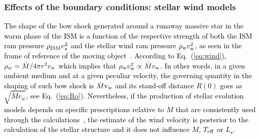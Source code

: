 \documentclass[useAMS,usenatbib]{mn2e}
\begin{document}


\subsubsection{Effects of the boundary conditions: stellar wind models}
\label{sect:physics33}


\textcolor{black}{
The shape of the bow shock generated around a runaway massive star in the warm 
phase of the ISM is a function of the respective strength of both the ISM ram 
pressure $\rho_{\rm ISM}v_{\star}^{2}$ and the stellar wind ram pressure 
$\rho_{\rm w}v_{\rm w}^{2}$, as seen in the frame of reference of the moving 
object~\citep[see explanations in][]{mohamed_aa_541_2012}. According to 
Eq.~(\ref{eq:wind}), $\rho_{w}=\dot{M} / 4\pi r^{2} v_{\rm w}$ which implies 
that $\rho_{\rm w}v_{\rm w}^{2} \propto \dot{M} v_{\rm w}$. In other words, in a 
given ambient medium and at a given peculiar velocity, the governing quantity 
in the shaping of such bow shock is $\dot{M}\rm v_{w}$ and its stand-off 
distance $R(0)$ goes as $\sqrt{ \dot{M} v_{w} }$, see Eq.~(\ref{eq:Ro}). 
Nevertheless, if the production of stellar evolution models depends on specific 
prescriptions relative to $\dot{M}$ that are consistently used through the 
calculations~\citep[in our case the recipe of][]{kudritzki_aa_219_1989}, 
the estimate of the wind velocity is posterior to the calculation of the 
stellar structure and it does not influence $\dot{M}$, $T_{\rm eff}$ or 
$L_{\star}$. 
}
\end{document}
